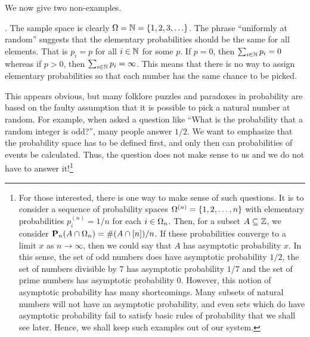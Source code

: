\documentclass[preprint,  11pt]{amsart}
\begin{document}
We now give two non-examples.
\begin{example}. The sample space is clearly $\Omega=\mathbb{N}=\{1,2,3,\ldots\}$. The phrase ``uniformly at random'' suggests that the elementary probabilities should be the same for all elements. That is $p_{i}=p$ for all $i\in \mathbb{N}$ for some $p$. If $p=0$, then $\sum_{i\in \mathbb{N}}p_{i}=0$ whereas if $p>0$, then $\sum_{i\in \mathbb{N}}p_{i}=\infty$. This means that there is no way to assign elementary probabilities so that each number has the same chance to be picked.

This appears obvious, but many folklore puzzles and paradoxes in probability are based on the faulty assumption that it is possible to pick a natural number at random. For example, when asked a question like ``What is the probability that a random integer is odd?'', many people answer $1/2$. We want to emphasize that the probability space has to be defined first, and only then can probabilities of events be calculated. Thus, the question does not make sense to us and we do not have to answer it!\footnote{For those interested, there is one way to make sense of such questions. It is to consider a sequence of probability spaces $\Omega^{(n)}=\{1,2,\ldots ,n\}$ with elementary probabilities $p^{(n)}_{i}=1/n$ for each $i\in \Omega_{n}$. Then, for a subset $A\subseteq \mathbb{Z}$, we consider $\mathbf{P}_{n}(A\cap \Omega_{n})=\#(A\cap [n])/n$. If these probabilities converge to a limit $x$ as $n\to \infty$, then we could say that $A$ has asymptotic probability $x$. In this sense, the set of odd numbers does have  asymptotic probability $1/2$, the set of numbers divisible by $7$ has asymptotic probability $1/7$ and the set of prime numbers has asymptotic probability $0$. However, this notion of asymptotic probability has many shortcomings. Many subsets of natural numbers will not have an asymptotic probability, and even sets which do have asymptotic probability fail to satisfy basic rules of probability that we shall see later. Hence, we shall keep such examples out of our system.}
\end{example}
\end{document}
